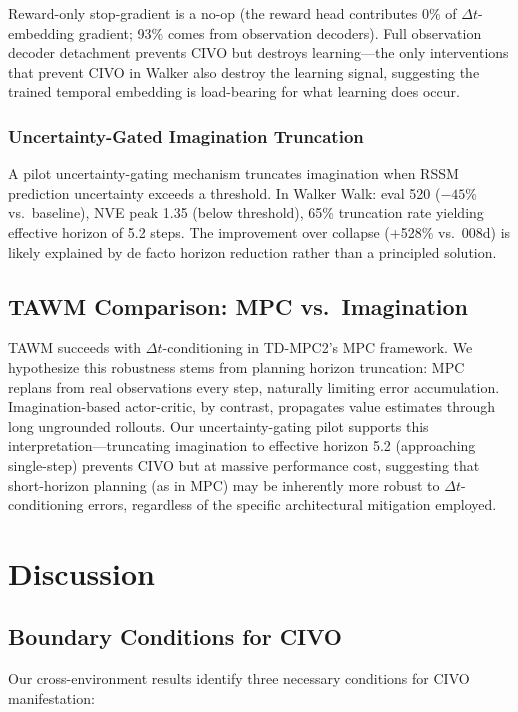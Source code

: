 \documentclass[letterpaper]{article}
\begin{document}
Reward-only stop-gradient is a no-op (the reward head contributes 0\% of $\Delta t$-embedding gradient; 93\% comes from observation decoders). Full observation decoder detachment prevents CIVO but destroys learning---the only interventions that prevent CIVO in Walker also destroy the learning signal, suggesting the trained temporal embedding is load-bearing for what learning does occur.

\subsubsection{Uncertainty-Gated Imagination Truncation}

A pilot uncertainty-gating mechanism truncates imagination when RSSM prediction uncertainty exceeds a threshold. In Walker Walk: eval 520 ($-45\%$ vs.\ baseline), NVE peak 1.35 (below threshold), 65\% truncation rate yielding effective horizon of 5.2 steps. The improvement over collapse (+528\% vs.\ 008d) is likely explained by de facto horizon reduction rather than a principled solution.

\subsection{TAWM Comparison: MPC vs.\ Imagination}

TAWM \citep{nhu2025tawm} succeeds with $\Delta t$-conditioning in TD-MPC2's MPC framework. We hypothesize this robustness stems from planning horizon truncation: MPC replans from real observations every step, naturally limiting error accumulation. Imagination-based actor-critic, by contrast, propagates value estimates through long ungrounded rollouts. Our uncertainty-gating pilot supports this interpretation---truncating imagination to effective horizon 5.2 (approaching single-step) prevents CIVO but at massive performance cost, suggesting that short-horizon planning (as in MPC) may be inherently more robust to $\Delta t$-conditioning errors, regardless of the specific architectural mitigation employed.

\section{Discussion}

\subsection{Boundary Conditions for CIVO}

Our cross-environment results identify three necessary conditions for CIVO manifestation:
\end{document}
